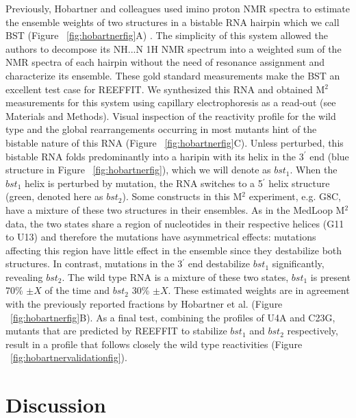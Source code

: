 \documentclass[12pt]{article}
\begin{document}
Previously, Hobartner and colleagues used imino proton NMR spectra to estimate the ensemble weights of two structures in a bistable RNA hairpin which we call BST (Figure ~\ref{fig:hobartnerfig}A) \cite{Hobartner2003}. 
The simplicity of this system allowed the authors to decompose its NH...N 1H NMR spectrum into a weighted sum of the NMR spectra of each hairpin without the need of resonance assignment and characterize its ensemble. 
These gold standard measurements make the BST an excellent test case for REEFFIT. 
We synthesized this RNA and obtained M$^2$ measurements for this system using capillary electrophoresis as a read-out (see Materials and Methods). 
Visual inspection of the reactivity profile for the wild type and the global rearrangements occurring in most mutants hint of the bistable nature of this RNA (Figure ~\ref{fig:hobartnerfig}C). 
Unless perturbed, this bistable RNA folds predominantly into a haripin with its helix in the 3$^{\prime}$ end (blue structure in Figure ~\ref{fig:hobartnerfig}), which we will denote as $bst_1$. When the $bst_1$ helix is perturbed by mutation, the RNA switches to a 5$^{\prime}$ helix structure (green, denoted here as $bst_2$). 
Some constructs in this M$^2$ experiment, e.g. G8C, have a mixture of these two structures in their ensembles. 
As in the MedLoop M$^2$ data, the two states share a region of nucleotides in their respective helices (G11 to U13) and therefore the mutations have asymmetrical effects: mutations affecting this region have little effect in the ensemble since they destabilize both structures.
In contrast, mutations in the 3$^{\prime}$ end destabilize $bst_1$ significantly, revealing $bst_2$. 
The wild type RNA is a mixture of these two states, $bst_1$ is present 70\% $\pm X$ of the time and $bst_2$ 30\% $\pm X$. 
These estimated weights are in agreement with the previously reported fractions by Hobartner et al. (Figure ~\ref{fig:hobartnerfig}B). 
As a final test, combining the profiles of U4A and C23G, mutants that are predicted by REEFFIT to stabilize $bst_1$ and $bst_2$ respectively, result in a profile that follows closely the wild type reactivities (Figure ~\ref{fig:hobartnervalidationfig}).

\section{Discussion}
\end{document}

